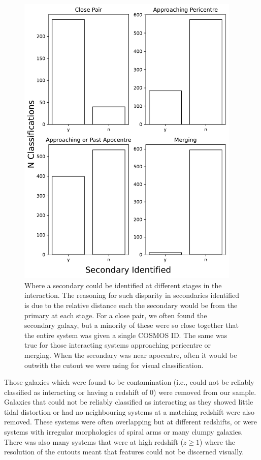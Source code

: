 \begin{figure}
    \centering
    \includegraphics[width=0.95\textwidth]{Chapter3/figures/visualisation_classification.pdf}
    \caption[Where a secondary could be identified at different stages in the interaction.]{Where a secondary could be identified at different stages in the interaction. The reasoning for such disparity in secondaries identified is due to the relative distance each the secondary would be from the primary at each stage. For a close pair, we often found the secondary galaxy, but a minority of these were so close together that the entire system was given a single COSMOS ID. The same was true for those interacting systems approaching pericentre or merging. When the secondary was near apocentre, often it would be outwith the cutout we were using for visual classification.}
    \label{fig:secondaries_found}
\end{figure}

Those galaxies which were found to be contamination (i.e., could not be reliably classified as interacting or having a redshift of 0) were removed from our sample. Galaxies that could not be reliably classified as interacting as they showed little tidal distortion or had no neighbouring systems at a matching redshift were also removed. These systems were often overlapping but at different redshifts, or were systems with irregular morphologies of spiral arms or many clumpy galaxies. There was also many systems that were at high redshift ($z \geq 1$) where the resolution of the cutouts meant that features could not be discerned visually.

